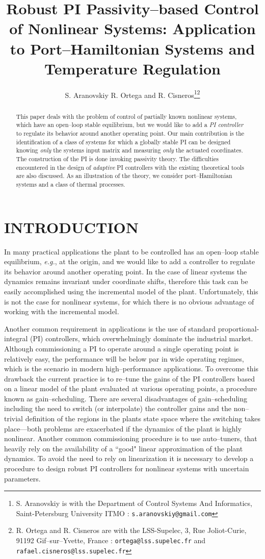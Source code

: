 \documentclass[10pt, conference]{ieeeconf}
\title{\LARGE \bf {Robust PI Passivity--based Control of Nonlinear Systems: Application to Port--Hamiltonian Systems and Temperature Regulation}}\date{}
\author{S. Aranovskiy R. Ortega and R. Cisneros\thanks{S. Aranovskiy is with the Department of Control Systems And Informatics, Saint-Petersburg University ITMO :  {\tt\small s.aranovskiy@gmail.com}}\thanks{R. Ortega and R. Cisneros are with the LSS-Supelec, 3, Rue Joliot-Curie, 91192 Gif--sur--Yvette, France : {\tt\small ortega@lss.supelec.fr} and {\tt\small rafael.cisneros@lss.supelec.fr} }}
\def\lab{\label}
\begin{document}
\maketitle
\thispagestyle{empty}
\pagestyle{empty}
	
\begin{abstract}
This paper deals with the problem of control of partially known nonlinear systems, which have an open--loop stable equilibrium, but we would like to add a {\em PI controller} to regulate its behavior around another operating point. Our main contribution is the identification of a class of systems for which  a globally stable PI can be designed knowing  {\em only} the systems input matrix and measuring {\em only} the actuated coordinates. The construction of the PI is done invoking passivity theory. The difficulties encountered in the design of {\em adaptive} PI controllers with the existing theoretical tools are also discussed. As an illustration of the theory, we consider port--Hamiltonian systems and a class of thermal processes.
\end{abstract}




\section{INTRODUCTION}
\lab{sec1}	
In many practical applications the plant to be controlled has an open--loop stable equilibrium, {\em e.g.}, at the origin, and we would like to add a controller to regulate its behavior around another operating point. In the case of linear systems the dynamics remains invariant under coordinate shifts, therefore this task can be easily accomplished using the incremental model of the plant. Unfortunately, this is not the case for nonlinear systems, for which there is no obvious advantage of working with the incremental model.

Another common requirement in applications is the use of standard proportional-integral (PI) controllers, which overwhelmingly dominate the industrial market. Although commissioning a PI to operate around a single operating point is relatively easy, the performance will be below par in wide operating regimes, which is the scenario in modern high--performance applications. To overcome this drawback the current practice is to re--tune the gains of the PI controllers based on a linear model of the plant evaluated at various operating points, a procedure known as gain--scheduling. There are several  disadvantages of gain--scheduling including the need to switch (or interpolate) the controller gains  and the non--trivial definition of the regions in the plants state space where the switching takes place---both problems are exacerbated if the dynamics of the plant is highly nonlinear. Another common commissioning procedure is to use auto--tuners,  that heavily rely on the availability of a ``good" linear approximation of the plant dynamics. To avoid the need to rely on linearization it is necessary to develop a procedure to design robust PI controllers for nonlinear systems with uncertain parameters.
\end{document}
